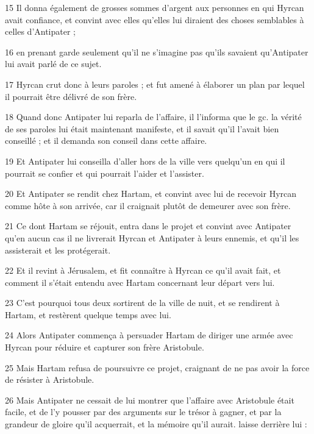 \par 15 Il donna également de grosses sommes d'argent aux personnes en qui Hyrcan avait confiance, et convint avec elles qu'elles lui diraient des choses semblables à celles d'Antipater ;

\par 16 en prenant garde seulement qu'il ne s'imagine pas qu'ils savaient qu'Antipater lui avait parlé de ce sujet.

\par 17 Hyrcan crut donc à leurs paroles ; et fut amené à élaborer un plan par lequel il pourrait être délivré de son frère.

\par 18 Quand donc Antipater lui reparla de l'affaire, il l'informa que le gc. la vérité de ses paroles lui était maintenant manifeste, et il savait qu'il l'avait bien conseillé ; et il demanda son conseil dans cette affaire.

\par 19 Et Antipater lui conseilla d'aller hors de la ville vers quelqu'un en qui il pourrait se confier et qui pourrait l'aider et l'assister.

\par 20 Et Antipater se rendit chez Hartam, et convint avec lui de recevoir Hyrcan comme hôte à son arrivée, car il craignait plutôt de demeurer avec son frère.

\par 21 Ce dont Hartam se réjouit, entra dans le projet et convint avec Antipater qu'en aucun cas il ne livrerait Hyrcan et Antipater à leurs ennemis, et qu'il les assisterait et les protégerait.

\par 22 Et il revint à Jérusalem, et fit connaître à Hyrcan ce qu'il avait fait, et comment il s'était entendu avec Hartam concernant leur départ vers lui.

\par 23 C'est pourquoi tous deux sortirent de la ville de nuit, et se rendirent à Hartam, et restèrent quelque temps avec lui.

\par 24 Alors Antipater commença à persuader Hartam de diriger une armée avec Hyrcan pour réduire et capturer son frère Aristobule.

\par 25 Mais Hartam refusa de poursuivre ce projet, craignant de ne pas avoir la force de résister à Aristobule.

\par 26 Mais Antipater ne cessait de lui montrer que l'affaire avec Aristobule était facile, et de l'y pousser par des arguments sur le trésor à gagner, et par la grandeur de gloire qu'il acquerrait, et la mémoire qu'il aurait. laisse derrière lui :

